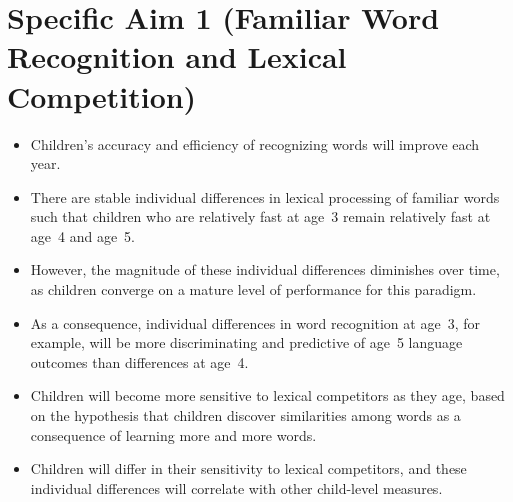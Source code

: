 \documentclass [11pt, proquest] {uwthesis}[2015/03/03]
\begin{document}
\section{Specific Aim 1 (Familiar Word Recognition and Lexical
Competition)}\label{specific-aim-1-familiar-word-recognition-and-lexical-competition-1}
\begin{itemize}
\item
  Children's accuracy and efficiency of recognizing words will improve
  each year.
\item
  There are stable individual differences in lexical processing of
  familiar words such that children who are relatively fast at age~3
  remain relatively fast at age~4 and age~5.
\item
  However, the magnitude of these individual differences diminishes over
  time, as children converge on a mature level of performance for this
  paradigm.
\item
  As a consequence, individual differences in word recognition at age~3,
  for example, will be more discriminating and predictive of age~5
  language outcomes than differences at age~4.
\item
  Children will become more sensitive to lexical competitors as they
  age, based on the hypothesis that children discover similarities among
  words as a consequence of learning more and more words.
\item
  Children will differ in their sensitivity to lexical competitors, and
  these individual differences will correlate with other child-level
  measures.
\end{itemize}
\end{document}
